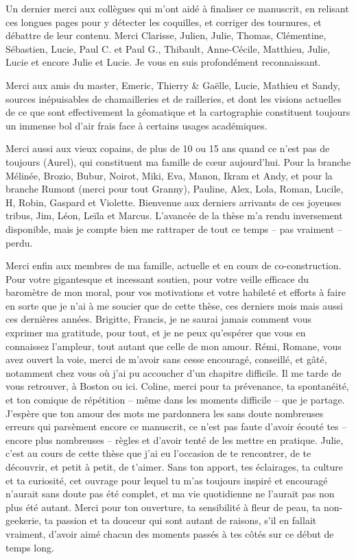 Un dernier merci aux collègues qui m'ont aidé à finaliser ce manuscrit, en relisant ces longues pages pour y détecter les coquilles, et corriger des tournures, et débattre de leur contenu.
Merci Clarisse, Julien, Julie, Thomas, Clémentine, Sébastien, Lucie, Paul C. et Paul G., Thibault, Anne-Cécile, Matthieu, Julie, Lucie et encore Julie et Lucie.
Je vous en suis profondément reconnaissant.

Merci aux amis du master, Emeric, Thierry \& Gaëlle, Lucie, Mathieu et Sandy, sources inépuisables de chamailleries et de railleries, et dont les visions actuelles de ce que sont effectivement la géomatique et la cartographie constituent toujours un immense bol d'air frais face à certains usages académiques.

Merci aussi aux vieux copains, de plus de 10 ou 15 ans quand ce n'est pas de toujours (Aurel), qui constituent ma famille de cœur aujourd'hui.
Pour la branche Mélinée, Brozio, Bubur, Noirot, Miki, Eva, Manon, Ikram et Andy, et pour la branche Rumont (merci pour tout Granny), Pauline, Alex, Lola, Roman, Lucile, H, Robin, Gaspard et Violette.
Bienvenue aux derniers arrivants de ces joyeuses tribus, Jim, Léon, Leïla et Marcus.
L'avancée de la thèse m'a rendu inversement disponible, mais je compte bien me rattraper de tout ce temps -- pas vraiment -- perdu.

Merci enfin aux membres de ma famille, actuelle et en cours de co-construction.
Pour votre gigantesque et incessant soutien, pour votre veille efficace du baromètre de mon moral, pour vos motivations et votre habileté et efforts à faire en sorte que je n'ai à me soucier que de cette thèse, ces derniers mois mais aussi ces dernières années.
Brigitte, Francis, je ne saurai jamais comment vous exprimer ma gratitude, pour tout, et je ne peux qu'espérer que vous en connaissez l'ampleur, tout autant que celle de mon amour.
Rémi, Romane, vous avez ouvert la voie, merci de m'avoir sans cesse encouragé, conseillé, et gâté, notamment chez vous où j'ai pu accoucher d'un chapitre difficile.
Il me tarde de vous retrouver, à Boston ou ici.
Coline, merci pour ta prévenance, ta spontanéité, et ton comique de répétition -- même dans les moments difficile -- que je partage.
J'espère que ton amour des mots me pardonnera les sans doute nombreuses erreurs qui parsèment encore ce manuscrit, ce n'est pas faute d'avoir écouté tes -- encore plus nombreuses -- règles et d'avoir tenté de les mettre en pratique.
Julie, c'est au cours de cette thèse que j'ai eu l'occasion de te rencontrer, de te découvrir, et petit à petit, de t'aimer.
Sans ton apport, tes éclairages, ta culture et ta curiosité, cet ouvrage pour lequel tu m'as toujours inspiré et encouragé n'aurait sans doute pas été complet, et ma vie quotidienne ne l'aurait pas non plus été autant.
Merci pour ton ouverture, ta sensibilité à fleur de peau, ta \og non-geekerie\fg{}, ta passion et ta douceur qui sont autant de raisons, s'il en fallait vraiment, d'avoir aimé chacun des moments passés à tes côtés sur ce début de temps long.
